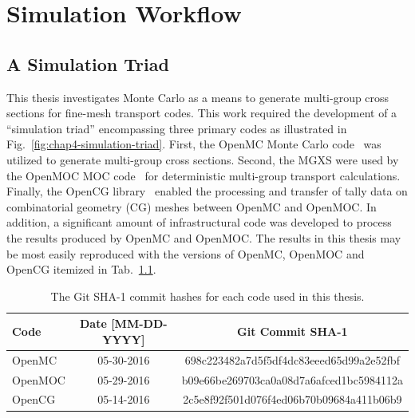 \chapter{Simulation Workflow}
\label{chap:workflow}

\section{A Simulation Triad}
\label{chap4:triad}

This thesis investigates Monte Carlo as a means to generate multi-group cross sections for fine-mesh transport codes. This work required the development of a ``simulation triad'' encompassing three primary codes as illustrated in Fig.~\ref{fig:chap4-simulation-triad}. First, the OpenMC Monte Carlo code~\cite{romano2013openmc} was utilized to generate multi-group cross sections. Second, the \ac{MGXS} were used by the OpenMOC \ac{MOC} code~\cite{boyd2014openmoc} for deterministic multi-group transport calculations. Finally, the OpenCG library~\cite{boyd2015opencg} enabled the processing and transfer of tally data on combinatorial geometry (CG) meshes between OpenMC and OpenMOC. In addition, a significant amount of infrastructural code was developed to process the results produced by OpenMC and OpenMOC. The results in this thesis may be most easily reproduced with the versions of OpenMC, OpenMOC and OpenCG itemized in Tab.~\ref{table:chap4-git-shas}.

\begin{table}[hb!]
  \centering
  \caption[OpenMC, OpenMOC and OpenCG Git SHA-1 hashes]{The Git SHA-1 commit hashes for each code used in this thesis.}
  \small
  \label{table:chap4-git-shas} 
  \vspace{6pt}
  \begin{tabular}{l c c}
  \toprule
  \rowcolor{lightgray}
  {\bf Code} &
  {\bf Date [MM-DD-YYYY]} &
  {\bf Git Commit SHA-1} \\
  \midrule
  OpenMC & 05-30-2016 & 698c223482a7d5f5df4dc83eeed65d99a2e52fbf \\
  OpenMOC\footnotemark & 05-29-2016 & b09e66be269703ca0a08d7a6afced1bc5984112a \\
  OpenCG & 05-14-2016 & 2c5e8f92f501d076f4ed06b70b09684a411b06b9 \\
  \bottomrule
\end{tabular}
\end{table}


